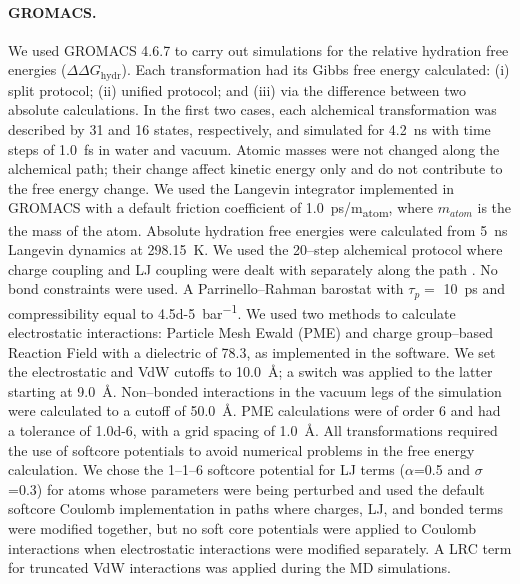 \documentclass[journal=jctcce,manuscript=article]{achemso}
\begin{document}
\paragraph{GROMACS.} We used GROMACS 4.6.7 to carry out simulations for
the relative hydration free energies ($\Delta \Delta G_{\mathrm{hydr}}$).
Each transformation had its Gibbs free energy calculated: (i) split
protocol; (ii) unified protocol;  and (iii) via the difference between
two absolute calculations.
In the first two cases, each alchemical transformation was described by 31 and
16 states, respectively, and simulated for \SI{4.2}{ns} with time steps of
\SI{1.0}{fs} in water and vacuum.  Atomic masses were not changed along the
alchemical path; their change affect kinetic energy only and do not
contribute to the free energy change.
We used the Langevin integrator implemented in GROMACS with a
default friction coefficient of \SI{1.0}{ps/m_{atom}}, where $m_{atom}$
is the the mass of the atom.  Absolute hydration
free energies were calculated from \SI{5}{ns} Langevin dynamics
at \SI{298.15}{K}. We used the 20--step alchemical protocol where
charge coupling and LJ coupling were dealt with separately
along the path \cite{Mobley2014, doi:10.1021/acs.jced.7b00104}.
No bond constraints were used.
A Parrinello--Rahman barostat with $\tau_p =$ \SI{10}{ps} and compressibility
equal to \SI{4.5d-5}{bar^{-1}}.
We used two methods to calculate electrostatic interactions: Particle Mesh
Ewald (PME) and charge group--based Reaction Field with a dielectric of 78.3,
as implemented in the software.
We set the electrostatic and VdW cutoffs to \SI{10.0}{\angstrom};
a switch was applied to the latter starting at \SI{9.0}{\angstrom}.
Non--bonded interactions in the vacuum legs of the simulation were calculated
to a cutoff of \SI{50.0}{\angstrom}.
PME calculations were of order 6 and had a
tolerance of \num{1.0d-6}, with a grid spacing of \SI{1.0}{\angstrom}.
All transformations required the use of softcore potentials to avoid numerical
problems in the free energy calculation.  We chose the 1--1--6 softcore
potential for LJ terms ($\alpha$=0.5 and $\sigma$=0.3) for
atoms whose parameters were being perturbed
and used the default softcore Coulomb implementation in paths where
charges, LJ, and bonded terms were modified together,
but no soft core potentials were applied to Coulomb interactions when
electrostatic interactions were modified separately.  A LRC term for
truncated VdW interactions was applied during the MD simulations.
\end{document}
